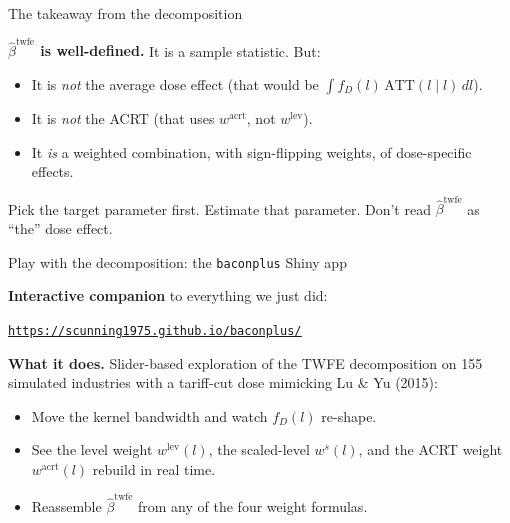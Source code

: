 \documentclass[aspectratio=169,12pt,t]{beamer}
\begin{document}
\begin{frame}{The takeaway from the decomposition}
\vspace{0.2cm}

\textbf{$\widehat\beta^{\text{twfe}}$ is well-defined.} \;It is a sample statistic. \;But:

\vspace{0.4cm}

\begin{itemize}\small\setlength\itemsep{2pt}
  \item It is \textit{not} the average dose effect \;(that would be $\int f_D(l)\,\text{ATT}(l \mid l)\,dl$).
  \item It is \textit{not} the ACRT \;(that uses $w^{\text{acrt}}$, not $w^{\text{lev}}$).
  \item It \textit{is} a weighted combination, with sign-flipping weights, of dose-specific effects.
\end{itemize}

\vspace{0.5cm}

 \;Pick the target parameter first. \;Estimate that parameter. \;Don't read $\widehat\beta^{\text{twfe}}$ as ``the'' dose effect.

\vspace{0.4em}
\end{frame}

\begin{frame}{Play with the decomposition: the \texttt{baconplus} Shiny app}
\vspace{0.2cm}

\textbf{Interactive companion} to everything we just did:
\begin{center}
\href{https://scunning1975.github.io/baconplus/}{\color{ocean}\underline{\texttt{https://scunning1975.github.io/baconplus/}}}
\end{center}

\vspace{0.3cm}

\textbf{What it does.} \;Slider-based exploration of the TWFE decomposition on 155 simulated industries with a tariff-cut dose mimicking Lu \& Yu (2015):
\begin{itemize}\small\setlength\itemsep{1pt}
  \item Move the kernel bandwidth and watch $f_D(l)$ re-shape.
  \item See the level weight $w^{\text{lev}}(l)$, the scaled-level $w^s(l)$, and the ACRT weight $w^{\text{acrt}}(l)$ rebuild in real time.
  \item Reassemble $\widehat\beta^{\text{twfe}}$ from any of the four weight formulas.
\end{itemize}

\vspace{0.3em}
\end{frame}
\end{document}
